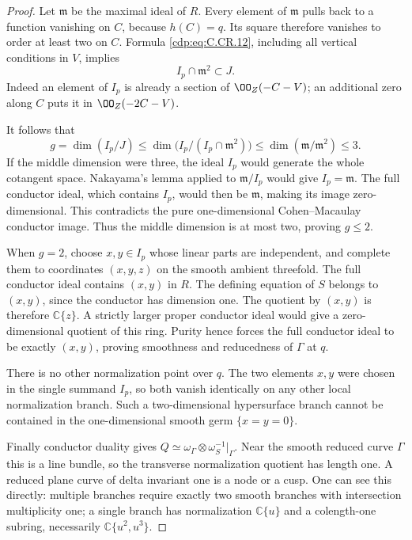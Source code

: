 \begin{proof}
Let $\mathfrak m$ be the maximal ideal of $R$. Every
element of $\mathfrak m$ pulls back to a function vanishing
on $C$, because $h(C)=q$. Its square therefore vanishes
to order at least two on $C$. Formula \eqref{cdp:eq:C.CR.12}, including
all vertical conditions in $V$, implies
\[
                 I_p\cap\mathfrak m^2\subset J.
 \tag{C.CR.13}\label{cdp:eq:C.CR.13}
\]
Indeed an element of $I_p$ is already a section of
$\OO_Z(-C-V)$; an additional zero along $C$ puts it
in $\OO_Z(-2C-V)$.

It follows that
\[
 g=\dim(I_p/J)
 \le \dim\bigl(I_p/(I_p\cap\mathfrak m^2)\bigr)
 \le \dim(\mathfrak m/\mathfrak m^2)\le3.
 \tag{C.CR.14}\label{cdp:eq:C.CR.14}
\]
If the middle dimension were three, the ideal $I_p$
would generate the whole cotangent space. Nakayama's
lemma applied to $\mathfrak m/I_p$ would give
$I_p=\mathfrak m$. The full conductor ideal, which
contains $I_p$, would then be $\mathfrak m$, making its
image zero-dimensional. This contradicts the pure
one-dimensional Cohen--Macaulay conductor image.
Thus the middle dimension is at most two, proving
$g\le2$.

When $g=2$, choose $x,y\in I_p$ whose linear parts
are independent, and complete them to coordinates
$(x,y,z)$ on the smooth ambient threefold. The full
conductor ideal contains $(x,y)$ in $R$. The defining
equation of $S$ belongs to $(x,y)$, since the conductor
has dimension one. The quotient by $(x,y)$ is therefore
$\mathbb C\{z\}$. A strictly larger proper conductor
ideal would give a zero-dimensional quotient of this
ring. Purity hence forces the full conductor ideal
to be exactly $(x,y)$, proving smoothness and
reducedness of $\Gamma$ at $q$.

There is no other normalization point over $q$.
The two elements $x,y$ were chosen in the single
summand $I_p$, so both vanish identically on any other
local normalization branch. Such a two-dimensional
hypersurface branch cannot be contained in the
one-dimensional smooth germ $\{x=y=0\}$.

Finally conductor duality gives
$Q\simeq\omega_\Gamma\otimes\omega_S^{-1}|_\Gamma$.
Near the smooth reduced curve $\Gamma$ this is a
line bundle, so the transverse normalization quotient
has length one. A reduced plane curve of delta
invariant one is a node or a cusp. One can see this
directly: multiple branches require exactly two
smooth branches with intersection multiplicity one;
a single branch has normalization
$\mathbb C\{u\}$ and a colength-one subring, necessarily
$\mathbb C\{u^2,u^3\}$.
\end{proof}


